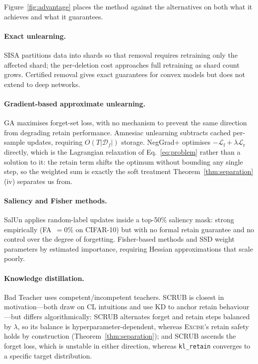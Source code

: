 \documentclass{article}
\newcommand{\ours}{\textsc{Excise}}
\newcommand{\klr}{\texttt{kl\_retain}}
\newcommand{\Df}{\mathcal{D}_f}
\newcommand{\lossf}{\mathcal{L}_{\mathrm{f}}}
\newcommand{\lossr}{\mathcal{L}_{\mathrm{r}}}
\theoremstyle{remark}
\theoremstyle{plain}
\begin{document}
Figure~\ref{fig:advantage} places the method against the alternatives on both
what it achieves and what it guarantees.

\paragraph{Exact unlearning.}
SISA \citep{bourtoule2021sisa} partitions data into shards so that removal
requires retraining only the affected shard; the per-deletion cost approaches
full retraining as shard count grows. Certified removal
\citep{guo2020certified} gives exact guarantees for convex models but does not
extend to deep networks.

\paragraph{Gradient-based approximate unlearning.}
GA \citep{thudi2022unrolling} maximises forget-set loss, with no mechanism to
prevent the same direction from degrading retain performance. Amnesiac
unlearning \citep{graves2021amnesiac} subtracts cached per-sample updates,
requiring $O(T|\Df|)$ storage. NegGrad+ optimises
$-\lossf + \lambda\lossr$ directly, which is the Lagrangian relaxation of
Eq.~\ref{eq:problem} rather than a solution to it: the retain term shifts the
optimum without bounding any single step, so the weighted sum is exactly the
soft treatment Theorem~\ref{thm:separation}(iv) separates us from.

\paragraph{Saliency and Fisher methods.}
SalUn \citep{fan2024salun} applies random-label updates inside a top-50\%
saliency mask: strong empirically (FA~$=0\%$ on CIFAR-10) but with no formal
retain guarantee and no control over the degree of forgetting. Fisher-based
methods \citep{golatkar2020eternal,golatkar2021scrubbing} and SSD
\citep{foster2024ssd} weight parameters by estimated importance, requiring
Hessian approximations that scale poorly.

\paragraph{Knowledge distillation.}
Bad Teacher \citep{chundawat2023badteacher} uses competent/incompetent teachers.
SCRUB \citep{kurmanji2023unbounded} is closest in motivation---both draw on CL
intuitions and use KD to anchor retain behaviour---but differs algorithmically:
SCRUB alternates forget and retain steps balanced by $\lambda$, so its balance is
hyperparameter-dependent, whereas \ours{}'s retain safety holds by construction
(Theorem~\ref{thm:separation}); and SCRUB ascends the forget loss, which is
unstable in either direction, whereas \klr{} converges to a specific target
distribution.
\end{document}
